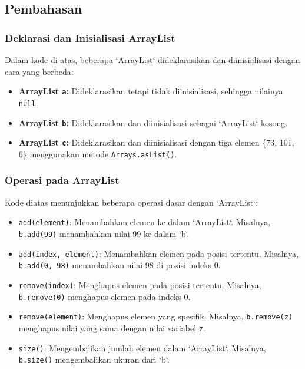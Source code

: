 \subsection{Pembahasan}

\subsubsection{Deklarasi dan Inisialisasi ArrayList}

Dalam kode di atas, beberapa `ArrayList` dideklarasikan dan diinisialisasi dengan cara yang berbeda:

\begin{itemize}
	\item \textbf{ArrayList \texttt{a}:} Dideklarasikan tetapi tidak diinisialisasi, sehingga nilainya \texttt{null}.
	\item \textbf{ArrayList \texttt{b}:} Dideklarasikan dan diinisialisasi sebagai `ArrayList` kosong.
	\item \textbf{ArrayList \texttt{c}:} Dideklarasikan dan diinisialisasi dengan tiga elemen \{73, 101, 6\} menggunakan metode \texttt{Arrays.asList()}.
\end{itemize}

\subsubsection{Operasi pada ArrayList}

Kode diatas menunjukkan beberapa operasi dasar dengan `ArrayList`:

\begin{itemize}
	\item \texttt{add(element)}: Menambahkan elemen ke dalam `ArrayList`. Misalnya, \texttt{b.add(99)} menambahkan nilai 99 ke dalam `b`.
	\item \texttt{add(index, element)}: Menambahkan elemen pada posisi tertentu. Misalnya, \texttt{b.add(0, 98)} menambahkan nilai 98 di posisi indeks 0.
	\item \texttt{remove(index)}: Menghapus elemen pada posisi tertentu. Misalnya, \texttt{b.remove(0)} menghapus elemen pada indeks 0.
	\item \texttt{remove(element)}: Menghapus elemen yang spesifik. Misalnya, \texttt{b.remove(z)} menghapus nilai yang sama dengan nilai variabel \texttt{z}.
	\item \texttt{size()}: Mengembalikan jumlah elemen dalam `ArrayList`. Misalnya, \texttt{b.size()} mengembalikan ukuran dari `b`.
\end{itemize}

